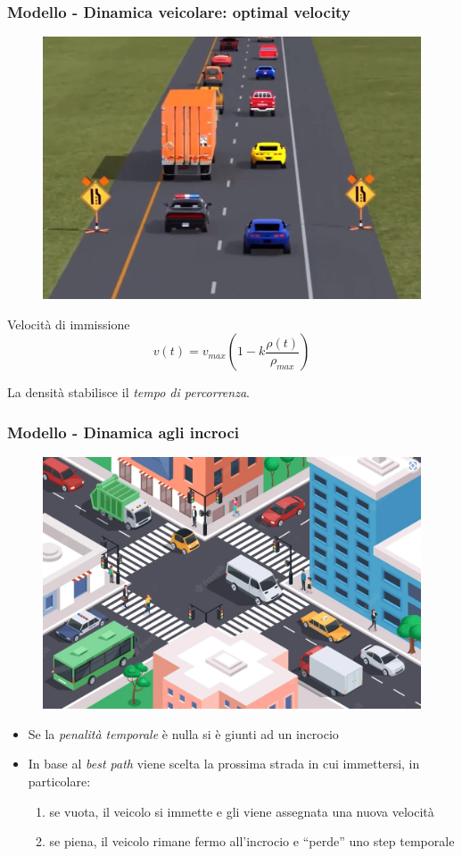 \documentclass[
	11pt, %
]{beamer}
\begin{document}
\begin{frame}
	\frametitle{Modello - Dinamica veicolare: optimal velocity}
	\begin{figure}
		\includegraphics[width=.33\textwidth]{cars.jpg}
	\end{figure}
	\begin{block}{Velocit\`a di immissione}
		\begin{equation*}
			v(t) = v_{max}\left(1-k\frac{\rho(t)}{\rho_{max}}\right)
		\end{equation*}
	\end{block}
	\vspace{10mm}
	La densit\`a stabilisce il \emph{tempo di percorrenza}.	
\end{frame}

\begin{frame}
	\frametitle{Modello - Dinamica agli incroci}
	\begin{figure}
		\includegraphics[width=.4\textwidth]{intersection.png}
	\end{figure}
	\begin{itemize}
		\item Se la \emph{penalit\`a temporale} \`e nulla si \`e giunti ad un incrocio
		\item In base al \emph{best path} viene scelta la prossima strada in cui immettersi, in particolare:
			\begin{enumerate}
				\item se vuota, il veicolo si immette e gli viene assegnata una nuova velocit\`a
				\item se piena, il veicolo rimane fermo all'incrocio e ``perde'' uno step temporale
			\end{enumerate}
	\end{itemize}
	
\end{frame}
\end{document}
